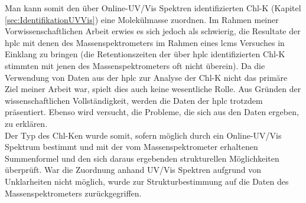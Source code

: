 Man kann somit den über Online-UV/Vis Spektren identifizierten \gls{Chl-K} (Kapitel \ref{sec:IdentifikationUVVis}) eine Molekülmasse zuordnen. Im Rahmen meiner Vorwissenschaftlichen Arbeit erwies es sich jedoch als schwierig, die Resultate der \gls{hplc} mit denen des Massenspektrometers im Rahmen eines \gls{lcms} Versuches in Einklang zu bringen (die Retentionszeiten der über \gls{hplc} identifizierten \gls{Chl-K} stimmten mit jenen des Massenspektrometers oft nicht überein). Da die Verwendung von Daten aus der \gls{hplc} zur Analyse der \gls{Chl-K} nicht das primäre Ziel meiner Arbeit war, spielt dies auch keine wesentliche Rolle. Aus Gründen der wissenschaftlichen Vollständigkeit, werden die Daten der \gls{hplc} trotzdem präsentiert. Ebenso wird versucht, die Probleme, die sich aus den Daten ergeben, zu erklären.\\

Der Typ des \gls{Chl-K}en wurde somit, sofern möglich durch ein Online-UV/Vis Spektrum bestimmt und mit der vom Massenspektrometer erhaltenen Summenformel und den sich daraus ergebenden strukturellen Möglichkeiten überprüft. War die Zuordnung anhand UV/Vis Spektren aufgrund von Unklarheiten nicht möglich, wurde zur Strukturbestimmung auf die Daten des Massenspektrometers zurückgegriffen.\\



